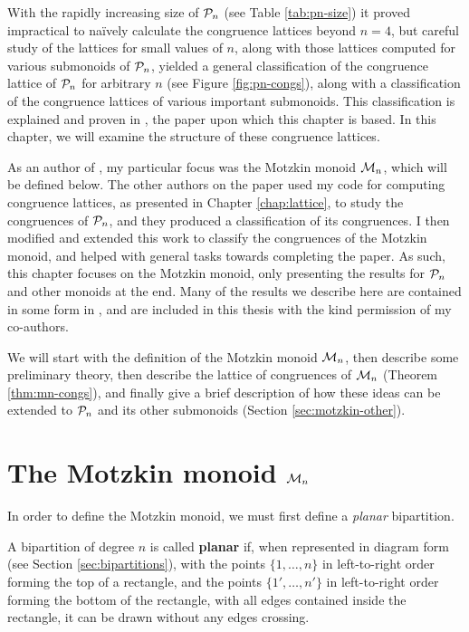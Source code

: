 With the rapidly increasing size of $\mathcal{P}_n$ (see Table \ref{tab:pn-size}) it
proved impractical to na\"ively calculate the congruence lattices beyond $n=4$,
but careful study of the lattices for small values of $n$, along with those
lattices computed for various submonoids of $\mathcal{P}_n$, yielded a general
classification of the congruence lattice of $\mathcal{P}_n$ for arbitrary $n$ (see
Figure \ref{fig:pn-congs}), along with a classification of the congruence
lattices of various important submonoids.  This classification is explained and
proven in \cite{ourpaper}, the paper upon which this chapter is based.
In this chapter, we will examine the structure of these congruence lattices.

As an author of \cite{ourpaper}, my particular focus was the Motzkin monoid
$\mathcal{M}_n$, which will be defined below.  The other authors on the paper used my
code for computing congruence lattices, as presented in Chapter
\ref{chap:lattice}, to study the congruences of $\mathcal{P}_n$, and they produced a
classification of its congruences.  I then modified and extended this work to
classify the congruences of the Motzkin monoid, and helped with general tasks
towards completing the paper.  As such, this chapter focuses on the Motzkin
monoid, only presenting the results for $\mathcal{P}_n$ and other monoids at the end.
Many of the results we describe here are contained in some form in
\cite{ourpaper}, and are included in this thesis with the kind permission of my
co-authors.

We will start with the definition of the Motzkin monoid $\mathcal{M}_n$, then describe
some preliminary theory, then describe the lattice of congruences of $\mathcal{M}_n$
(Theorem \ref{thm:mn-congs}), and finally give a brief description of how these
ideas can be extended to $\mathcal{P}_n$ and its other submonoids (Section
\ref{sec:motzkin-other}).

\section{The Motzkin monoid $\mathcal{M}_n$}
\label{sec:motzkin-monoid}
In order to define the Motzkin monoid, we must first define a \textit{planar}
bipartition.

\begin{definition}
  \label{def:planar}
  A bipartition of degree $n$ is called \textbf{planar} if, when represented in
  diagram form (see Section \ref{sec:bipartitions}),
  with the points $\{1, \ldots, n\}$ in left-to-right order forming the top of a
  rectangle,
  and the points $\{1', \ldots, n'\}$ in left-to-right order forming the bottom
  of the rectangle,
  with all edges contained inside the rectangle,
  it can be drawn without any edges crossing.
\end{definition}


